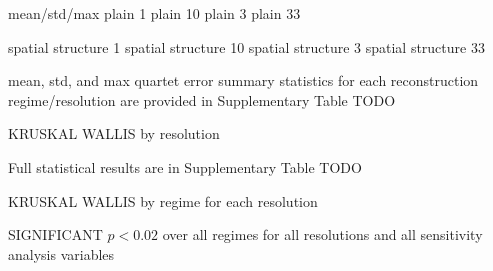 

mean/std/max
plain	1%
plain	10%
plain	3%
plain	33%


spatial structure	1%
spatial structure	10%
spatial structure	3%
spatial structure	33%

mean, std, and max quartet error summary statistics for each reconstruction regime/resolution are provided in Supplementary Table TODO


KRUSKAL WALLIS by resolution
%
%
%

Full statistical results are in Supplementary Table TODO

KRUSKAL WALLIS by regime for each resolution

SIGNIFICANT $p < 0.02$ over all regimes for all resolutions and all sensitivity analysis variables
